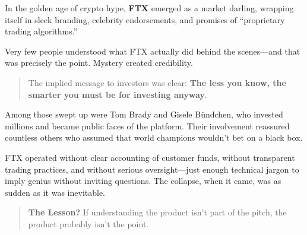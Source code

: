 \begin{tcolorbox}[colback=blue!5!white, colframe=blue!50!black,
  title={Historical Sidebar: When Mystery Outsells Reality --- The FTX Collapse}]

In the golden age of crypto hype, \textbf{FTX} emerged as a market darling, wrapping itself in sleek branding, celebrity endorsements, and promises of ``proprietary trading algorithms.''

\medskip

Very few people understood what FTX actually did behind the scenes—and that was precisely the point.  Mystery created credibility.

\medskip

\begin{quote}
The implied message to investors was clear: \textbf{The less you know, the smarter you must be for investing anyway}.
\end{quote}

\medskip

Among those swept up were Tom Brady and Gisele Bündchen, who invested millions and became public faces of the platform.  Their involvement reassured countless others who assumed that world champions wouldn’t bet on a black box.

\medskip

FTX operated without clear accounting of customer funds, without transparent trading practices, and without serious oversight—just enough technical jargon to imply genius without inviting questions.  The collapse, when it came, was as sudden as it was inevitable.

\medskip

\begin{quote}
\textbf{The Lesson?} If understanding the product isn't part of the pitch, the product probably isn't the point.
\end{quote}

\end{tcolorbox}
